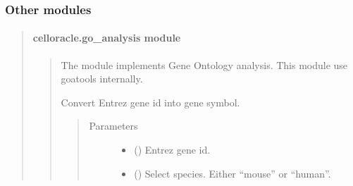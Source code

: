 \documentclass[letterpaper,10pt,english]{sphinxmanual}
\begin{document}
\subsubsection{Other modules}
\label{\detokenize{modules/celloracle:other-modules}}\begin{quote}


\paragraph{celloracle.go\_analysis module}
\label{\detokenize{modules/celloracle.go_analysis:celloracle-go-analysis-module}}\label{\detokenize{modules/celloracle.go_analysis::doc}}\begin{quote}
\label{\detokenize{modules/celloracle.go_analysis:module-celloracle.go_analysis}}
The {\hyperref[\detokenize{modules/celloracle.go_analysis:module-celloracle.go_analysis}]{}} module implements Gene Ontology analysis.
This module use goatools internally.

\begin{fulllineitems}
\label{\detokenize{modules/celloracle.go_analysis:celloracle.go_analysis.geneID2Symbol}}
Convert Entrez gene id into gene symbol.
\begin{quote}\begin{description}
\item[{Parameters}] \leavevmode\begin{itemize}
\item {} 
 () \textendash{} Entrez gene id.

\item {} 
 () \textendash{} Select species. Either “mouse” or “human”.

\end{itemize}


\end{description}
\end{quote}
\end{fulllineitems}
\end{quote}
\end{quote}
\end{document}
